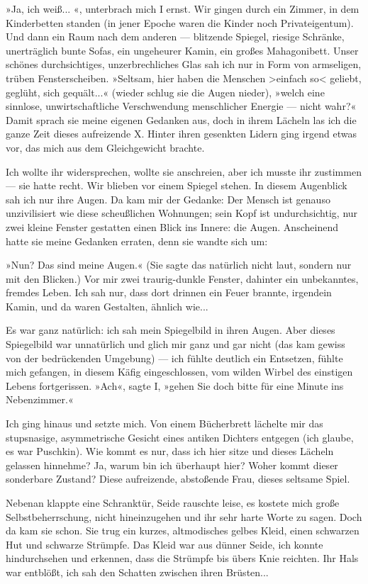 »Ja, ich weiß... «, unterbrach mich I ernst. Wir gingen durch ein
Zimmer, in dem Kinderbetten standen (in jener Epoche waren die
Kinder noch Privateigentum). Und dann ein Raum nach dem anderen —
blitzende Spiegel, riesige Schränke, unerträglich bunte Sofas, ein
ungeheurer Kamin, ein großes Mahagonibett. Unser schönes
durchsichtiges, unzerbrechliches Glas sah ich nur in Form von
armseligen, trüben Fensterscheiben. »Seltsam, hier haben die
Menschen \textgreater{}einfach so\textless{} geliebt, geglüht, sich
gequält...« (wieder schlug sie die Augen nieder), »welch eine
sinnlose, unwirtschaftliche Verschwendung menschlicher Energie —
nicht wahr?« Damit sprach sie meine eigenen Gedanken aus, doch in
ihrem Lächeln las ich die ganze Zeit dieses aufreizende X. Hinter
ihren gesenkten Lidern ging irgend etwas vor, das mich aus dem
Gleichgewicht brachte.

Ich wollte ihr widersprechen, wollte sie anschreien, aber ich
musste ihr zustimmen — sie hatte recht. Wir blieben vor einem
Spiegel stehen. In diesem Augenblick sah ich nur ihre Augen. Da kam
mir der Gedanke: Der Mensch ist genauso unzivilisiert wie diese
scheußlichen Wohnungen; sein Kopf ist undurchsichtig, nur zwei
kleine Fenster gestatten einen Blick ins Innere: die Augen.
Anscheinend hatte sie meine Gedanken erraten, denn sie wandte sich
um:

»Nun? Das sind meine Augen.« (Sie sagte das natürlich nicht laut,
sondern nur mit den Blicken.) Vor mir zwei traurig-dunkle Fenster,
dahinter ein unbekanntes, fremdes Leben. Ich sah nur, dass dort
drinnen ein Feuer brannte, irgendein Kamin, und da waren Gestalten,
ähnlich wie...

Es war ganz natürlich: ich sah mein Spiegelbild in ihren Augen.
Aber dieses Spiegelbild war unnatürlich und glich mir ganz und gar
nicht (das kam gewiss von der bedrückenden Umgebung) — ich fühlte
deutlich ein Entsetzen, fühlte mich gefangen, in diesem Käfig
eingeschlossen, vom wilden Wirbel des einstigen Lebens
fortgerissen. »Ach«, sagte I, »gehen Sie doch bitte für eine Minute
ins Nebenzimmer.«

Ich ging hinaus und setzte mich. Von einem Bücherbrett lächelte mir
das stupsnasige, asymmetrische Gesicht eines antiken Dichters
entgegen (ich glaube, es war Puschkin). Wie kommt es nur, dass ich
hier sitze und dieses Lächeln gelassen hinnehme? Ja, warum bin ich
überhaupt hier? Woher kommt dieser sonderbare Zustand? Diese
aufreizende, abstoßende Frau, dieses seltsame Spiel.

Nebenan klappte eine Schranktür, Seide rauschte leise, es kostete
mich große Selbstbeherrschung, nicht hineinzugehen und ihr sehr
harte Worte zu sagen. Doch da kam sie schon. Sie trug ein kurzes,
altmodisches gelbes Kleid, einen schwarzen Hut und schwarze
Strümpfe. Das Kleid war aus dünner Seide, ich konnte hindurchsehen
und erkennen, dass die Strümpfe bis übers Knie reichten. Ihr Hals
war entblößt, ich sah den Schatten zwischen ihren Brüsten...

